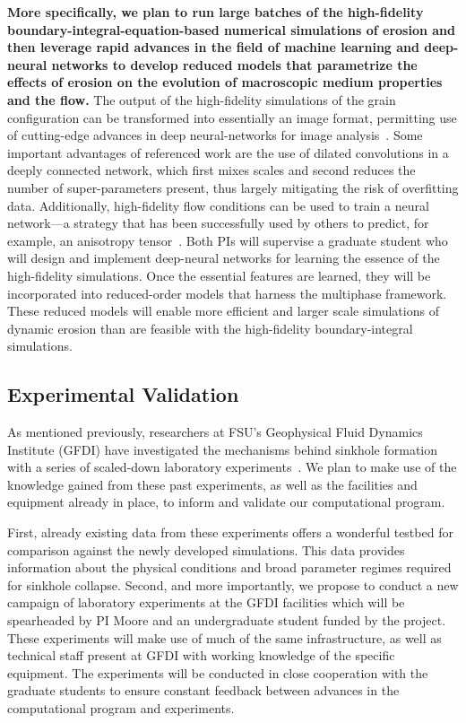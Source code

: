 \documentclass[11pt]{article}
\begin{document}
{\bf More specifically, we plan to run large batches of the high-fidelity boundary-integral-equation-based numerical simulations of erosion and then leverage rapid advances in the field of machine learning and deep-neural networks \cite{ling2016reynolds, kutz2017deep, ling2016machine, pelt2018mixed} to develop reduced models that parametrize the effects of erosion on the evolution of macroscopic medium properties and the flow.}  The output of the high-fidelity simulations of the grain configuration can be transformed into essentially an image format, permitting use of cutting-edge advances in deep neural-networks for image analysis~\cite{pelt2018mixed}. Some important advantages of referenced work are the use of dilated convolutions in a deeply connected network, which first mixes scales and second reduces the number of super-parameters present, thus largely mitigating the risk of overfitting data. Additionally, high-fidelity flow conditions can be used to train a neural network---a strategy that has been successfully used by others to predict, for example, an anisotropy tensor~\cite{ling2016reynolds}.  Both PIs will supervise a graduate student who will design and implement deep-neural networks for learning the essence of the high-fidelity simulations. Once the essential features are learned, they will be incorporated into reduced-order models that harness the multiphase framework. These reduced models will enable more efficient and larger scale simulations of dynamic erosion than are feasible with the high-fidelity boundary-integral simulations.

\subsection{Experimental Validation}
\label{sec:experiments}

	As mentioned previously, researchers at FSU's Geophysical Fluid Dynamics Institute (GFDI) have investigated the mechanisms behind sinkhole formation with a series of scaled-down laboratory experiments~\cite{tao2014experimental}. We plan to make use of the knowledge gained from these past experiments, as well as the facilities and equipment already in place, to inform and validate our computational program. 
	
	First, already existing data from these experiments offers a wonderful testbed for comparison against the newly developed simulations. This data provides information about the physical conditions and broad parameter regimes required for sinkhole collapse. Second, and more importantly, we propose to conduct a new campaign of laboratory experiments at the GFDI facilities which will be spearheaded by PI Moore and an undergraduate student funded by the project. These experiments will make use of much of the same infrastructure, as well as technical staff present at GFDI with working knowledge of the specific equipment. The experiments will be conducted in close cooperation with the graduate students to ensure constant feedback between advances in the computational program and experiments.
\end{document}
